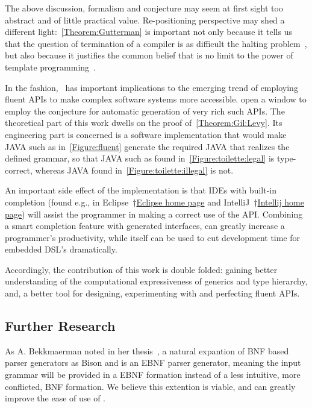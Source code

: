 The above discussion, formalism and conjecture may seem at first sight too abstract
  and of little practical value.
Re-positioning perspective may shed a different light:~\cref{Theorem:Gutterman} is important not only because it tells us
  that the question of termination of a \CC compiler is as difficult
  the halting problem~\cite{Turing:1936}, but also because it
  justifies the common belief that is no limit to the power of
  template programming~\cite{Musser:Stepanov:1989,Dehnert:Stepanov:2000
  ,Backhouse:Jansson:1999, Austern:1998,Bracha:Odersky:1998,Garcia:Jarvi:2003}.

In the fashion,~ has important
  implications to the emerging trend of employing fluent APIs
  to make complex software systems more accessible.
\Self open a window to employ the conjecture for
  automatic generation of very rich such APIs.
The theoretical part of this work dwells on the proof of~\cref{Theorem:Gil:Levy}.
Its engineering part is concerned is
  a software implementation that would make JAVA
  such as in~\cref{Figure:fluent} generate
  the required \Java JAVA that realizes the
  defined grammar, so that JAVA such as
  found in~\cref{Figure:toilette:legal} is type-correct,
  whereas JAVA found in~\cref{Figure:toilette:illegal} is not.	

An important side effect of the implementation is that IDEs with built-in \Java completion
  (found e.g., in Eclipse~†{\href{http://www.eclipse.org/}{Eclipse home page}} and IntelliJ~†{\href{https://www.jetbrains.com/idea/}{Intellij home page}})
  will assist the programmer in making a correct use of the API.
Combining a smart \Java completion feature with \Self generated interfaces,
  can greatly increase a programmer's productivity, while \Self itself can be used
  to cut development time for embedded DSL's dramatically.


Accordingly, the contribution of this work is double folded:
  gaining better understanding of the computational expressiveness of
  \Java generics and type hierarchy, and, a better tool
  for designing, experimenting with and perfecting fluent APIs.

\subsection{Further Research}
As A. Bekkmaerman noted in her thesis~\cite{Bekkerman:04}, a natural expantion of
  BNF based parser generators as Bison and \Self is an EBNF parser generator,
  meaning the input grammar will be provided in a EBNF formation instead of a
  less intuitive, more conflicted, BNF formation.
We believe this extention is viable, and can greatly improve the ease of
  use of \Self.
